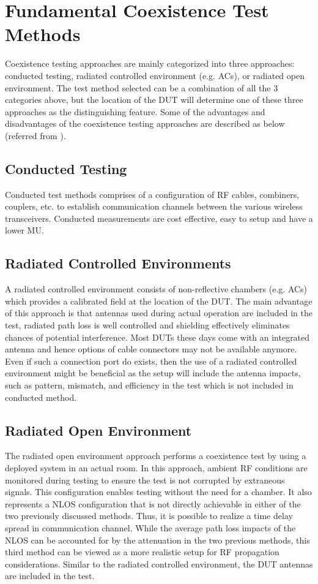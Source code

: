 \section{Fundamental Coexistence Test Methods}
Coexistence testing approaches are mainly categorized into three approaches: conducted testing, radiated controlled environment (e.g. \acsp{AC}), or radiated open environment. The test method selected can be a combination of all the 3 categories above, but the location of the \acs{DUT} will determine one of these three approaches as the distinguishing feature. Some of the advantages and disadvantages of the coexistence testing approaches are described as below (referred from \cite{gonzalez}).

\subsection{Conducted Testing}
Conducted test methods comprises of a configuration of \acs{RF} cables, combiners, couplers, etc. to establish communication channels between the various wireless transceivers. Conducted measurements are cost effective, easy to setup and have a lower \acf{MU}.

\subsection{Radiated Controlled Environments}
A radiated controlled environment consists of non-reflective chambers (e.g. \acsp{AC}) which provides a calibrated field at the location of the \acs{DUT}. The main advantage of this approach is that antennas used during actual operation are included in the test, radiated path loss is well controlled and shielding effectively eliminates chances of potential interference. Most \acsp{DUT} these days come with an integrated antenna and hence options of cable connectors may not be available anymore. Even if such a connection port do exists, then the use of a radiated controlled environment might be beneficial as the setup will include the antenna impacts, such as pattern, mismatch, and efficiency in the test which is not included in conducted method.

\subsection{Radiated Open Environment}
The radiated open environment approach performs a coexistence test by using a deployed system in an actual room. In this approach, ambient \acs{RF} conditions are monitored during testing to ensure the test is not corrupted by extraneous signals. This configuration enables testing without the need for a chamber. It also represents a \acf{NLOS} configuration that is not directly achievable in either of the two previously discussed methods. Thus, it is possible to realize a time delay spread in communication channel. While the average path loss impacts of the \acs{NLOS} can be accounted for by the attenuation in the two previous methods, this third method can be viewed as a more realistic setup for \acs{RF} propagation considerations. Similar to the radiated controlled environment, the \acs{DUT} antennas are included in the test. 

